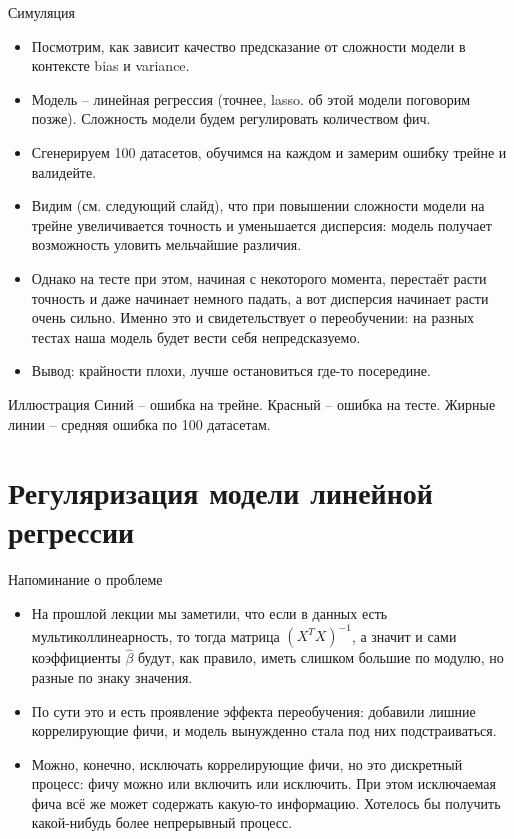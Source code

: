 \documentclass[9pt]{beamer}
\begin{document}

\begin{frame}{Симуляция}
\begin{itemize}
    \item Посмотрим, как зависит качество предсказание от сложности модели в контексте bias и variance.
    \item Модель -- линейная регрессия (точнее, lasso. об этой модели поговорим позже). Сложность модели будем регулировать количеством фич.
    \item Сгенерируем 100 датасетов, обучимся на каждом и замерим ошибку трейне и валидейте.
    \item Видим (см. следующий слайд), что при повышении сложности модели на трейне увеличивается точность и уменьшается дисперсия: модель получает возможность уловить мельчайшие различия.
    \item Однако на тесте при этом, начиная с некоторого момента, перестаёт расти точность и даже начинает немного падать, а вот дисперсия начинает расти очень сильно. Именно это и свидетельствует о переобучении: на разных тестах наша модель будет вести себя непредсказуемо.
    \item Вывод: крайности плохи, лучше остановиться где-то посередине.
\end{itemize}
\end{frame}

\begin{frame}{Иллюстрация}
    Синий -- ошибка на трейне. Красный -- ошибка на тесте. Жирные линии -- средняя ошибка по 100 датасетам.
\end{frame}

\section{Регуляризация модели линейной регрессии}

\begin{frame}{Напоминание о проблеме}
    \begin{itemize}
        \item На прошлой лекции мы заметили, что если в данных есть мультиколлинеарность, то тогда матрица $(X^TX)^{-1}$, а значит и сами коэффициенты $\hat \beta$ будут, как правило, иметь слишком большие по модулю, но разные по знаку значения.
        \item По сути это и есть проявление эффекта переобучения: добавили лишние коррелирующие фичи, и модель вынужденно стала под них подстраиваться.
        \item Можно, конечно, исключать коррелирующие фичи, но это дискретный процесс: фичу можно или включить или исключить. При этом исключаемая фича всё же может содержать какую-то информацию. Хотелось бы получить какой-нибудь более непрерывный процесс.
    \end{itemize}
\end{frame}
\end{document}
